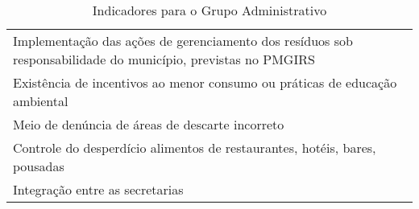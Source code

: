 \begin{table}[h!]
  \centering
  \caption{Indicadores para o Grupo Administrativo}
    \begin{tabular}{|p{25em}|}
    \rowcolor[rgb]{ .867,  .922,  .969}  
    \multicolumn{1}{P{25em}}{GRUPO ADMINISTRATIVO}  \\
    \midrule
    Implementação das ações de gerenciamento dos resíduos sob responsabilidade do município, previstas no PMGIRS \\
    \midrule
    Existência de incentivos ao menor consumo ou práticas de educação ambiental \\
    \midrule
    Meio de denúncia de áreas de descarte incorreto \\
    \midrule
    Controle do desperdício alimentos de restaurantes, hotéis, bares, pousadas \\
    \midrule
    Integração entre as secretarias \\
    \bottomrule
    \end{tabular}%
  \label{tab:ind_adm}%
\end{table}%
